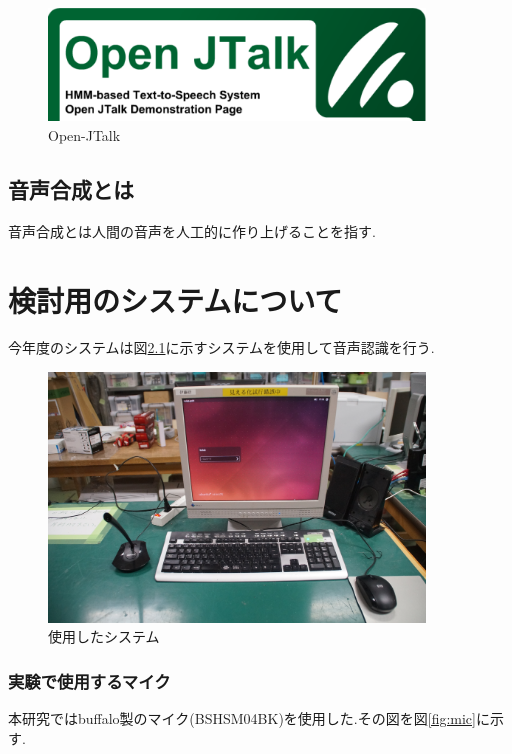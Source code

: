 \documentclass[12pt,oneside]{sotsuken_paper}
\begin{document}
\begin{figure}[htbp]
\begin{center}
\includegraphics[width=100mm]{img/openjtalk.png}
\caption{Open-JTalk}
\label{fig:OpenJTalk}
\end{center}
\end{figure}

\section{音声合成とは}
音声合成とは人間の音声を人工的に作り上げることを指す.


\chapter{検討用のシステムについて}
今年度のシステムは図\ref{fig:robot}に示すシステムを使用して音声認識を行う.


\begin{figure}[htbp]
\begin{center}
\includegraphics[width=100mm]{img/robo.JPG}
\caption{使用したシステム}
\label{fig:robot}
\end{center}
\end{figure}


\subsection{実験で使用するマイク}
本研究ではbuffalo製のマイク(BSHSM04BK)を使用した.その図を図\ref{fig:mic}に示す.
\end{document}

